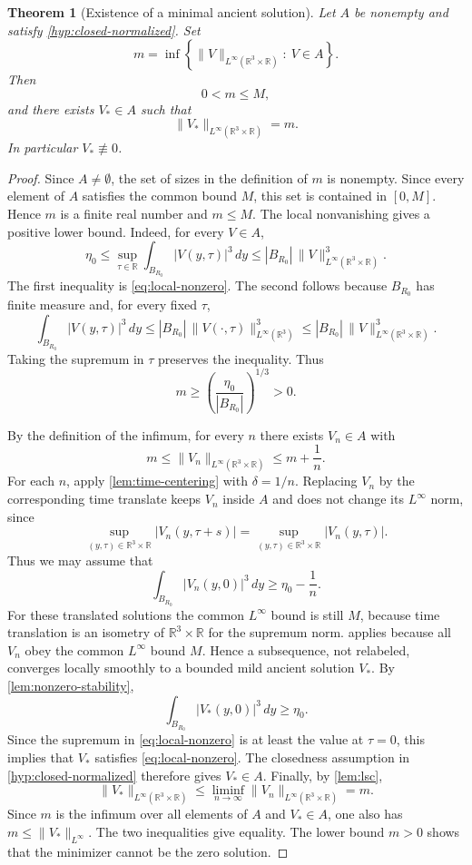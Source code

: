 \documentclass[11pt]{amsart}
\theoremstyle{plain}
\newtheorem{theorem}{Theorem}[section]
\theoremstyle{definition}
\theoremstyle{remark}
\numberwithin{equation}{section}
\begin{document}
\begin{theorem}[Existence of a minimal ancient solution]\label{thm:minimal-existence}
Let \(A\) be nonempty and satisfy \cref{hyp:closed-normalized}.  Set
\[
   m=\inf\left\{
      \|V\|_{L^\infty(\mathbb R^3\times\mathbb R)}:\ V\in A
   \right\}.
\]
Then
\[
   0<m\le M,
\]
and there exists \(V_*\in A\) such that
\[
   \|V_*\|_{L^\infty(\mathbb R^3\times\mathbb R)}=m .
\]
In particular \(V_*\not\equiv0\).
\end{theorem}

\begin{proof}
Since \(A\ne\emptyset\), the set of sizes in the definition of \(m\) is
nonempty.  Since every element of \(A\) satisfies the common bound \(M\), this
set is contained in \([0,M]\).  Hence \(m\) is a finite real number and
\(m\le M\).  The local nonvanishing gives a positive lower bound.  Indeed, for
every \(V\in A\),
\[
   \eta_0
   \le
   \sup_{\tau\in\mathbb R}\int_{B_{R_0}}|V(y,\tau)|^3\,dy
   \le
   |B_{R_0}|\,
   \|V\|_{L^\infty(\mathbb R^3\times\mathbb R)}^3 .
\]
The first inequality is \eqref{eq:local-nonzero}.  The second follows
because \(B_{R_0}\) has finite measure and, for every fixed \(\tau\),
\[
   \int_{B_{R_0}}|V(y,\tau)|^3\,dy
   \le |B_{R_0}|\,
   \|V(\cdot,\tau)\|_{L^\infty(\mathbb R^3)}^3
   \le |B_{R_0}|\,
   \|V\|_{L^\infty(\mathbb R^3\times\mathbb R)}^3 .
\]
Taking the supremum in \(\tau\) preserves the inequality.
Thus
\[
   m\ge \left(\frac{\eta_0}{|B_{R_0}|}\right)^{1/3}>0 .
\]

By the definition of the infimum, for every \(n\) there exists \(V_n\in A\)
with
\[
   m
   \le
   \|V_n\|_{L^\infty(\mathbb R^3\times\mathbb R)}
   \le
   m+\frac1n .
\]
For each \(n\), apply \cref{lem:time-centering} with \(\delta=1/n\).  Replacing
\(V_n\) by the corresponding time translate keeps \(V_n\) inside \(A\) and
does not change its \(L^\infty\) norm, since
\[
   \sup_{(y,\tau)\in\mathbb R^3\times\mathbb R}|V_n(y,\tau+s)|
   =
   \sup_{(y,\tau)\in\mathbb R^3\times\mathbb R}|V_n(y,\tau)|.
\]
Thus we may assume that
\[
   \int_{B_{R_0}}|V_n(y,0)|^3\,dy\ge\eta_0-\frac1n .
\]
For these translated solutions the common \(L^\infty\) bound is still \(M\),
because time translation is an isometry of
\(\mathbb R^3\times\mathbb R\) for the supremum norm.
 applies because all \(V_n\) obey the common
\(L^\infty\) bound \(M\).  Hence a subsequence, not relabeled, converges
locally smoothly to a bounded mild ancient solution \(V_*\).
By \cref{lem:nonzero-stability},
\[
   \int_{B_{R_0}}|V_*(y,0)|^3\,dy\ge\eta_0 .
\]
Since the supremum in \eqref{eq:local-nonzero} is at least the value at
\(\tau=0\), this implies that \(V_*\) satisfies \eqref{eq:local-nonzero}.  The
closedness assumption in \cref{hyp:closed-normalized} therefore gives
\(V_*\in A\).
Finally, by \cref{lem:lsc},
\[
   \|V_*\|_{L^\infty(\mathbb R^3\times\mathbb R)}
   \le
   \liminf_{n\to\infty}
   \|V_n\|_{L^\infty(\mathbb R^3\times\mathbb R)}
   =
   m .
\]
Since \(m\) is the infimum over all elements of \(A\) and \(V_*\in A\), one
also has \(m\le\|V_*\|_{L^\infty}\).  The two inequalities give equality.
The lower bound \(m>0\) shows that the minimizer cannot be the zero solution.
\end{proof}
\end{document}
